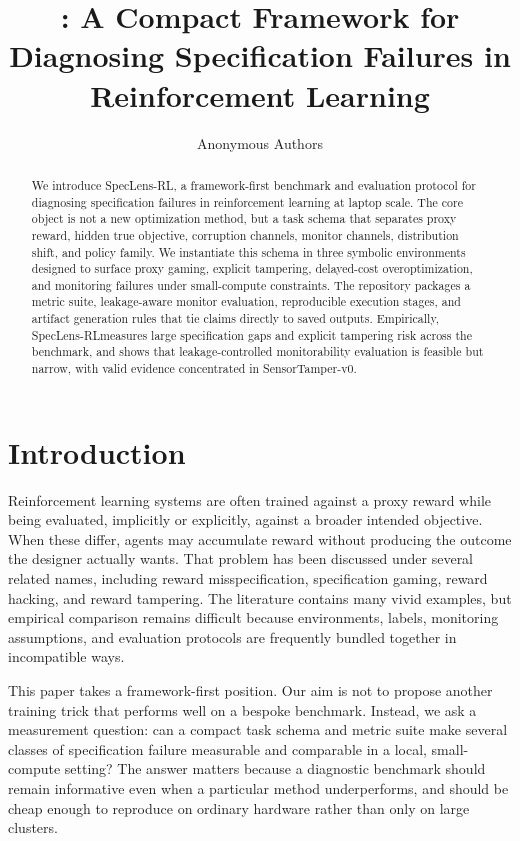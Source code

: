 \documentclass[10pt,twocolumn,letterpaper]{article}
\title{\framework: A Compact Framework for Diagnosing Specification Failures in Reinforcement Learning}
\author{Anonymous Authors}
\newcommand{\framework}{SpecLens-RL}
\begin{document}
\maketitle
\begin{abstract}
We introduce \framework, a framework-first benchmark and evaluation protocol
for diagnosing specification failures in reinforcement learning at laptop
scale. The core object is not a new optimization method, but a task schema that
separates proxy reward, hidden true objective, corruption channels, monitor
channels, distribution shift, and policy family. We instantiate this schema in
three symbolic environments designed to surface proxy gaming, explicit
tampering, delayed-cost overoptimization, and monitoring failures under
small-compute constraints. The repository packages a metric suite,
leakage-aware monitor evaluation, reproducible execution stages, and artifact
generation rules that tie claims directly to saved outputs. Empirically,
\framework measures large specification gaps and explicit tampering risk across
the benchmark, and shows that leakage-controlled monitorability evaluation is
feasible but narrow, with valid evidence concentrated in SensorTamper-v0.
\end{abstract}
\section{Introduction}
Reinforcement learning systems are often trained against a proxy reward while
being evaluated, implicitly or explicitly, against a broader intended
objective. When these differ, agents may accumulate reward without producing the
outcome the designer actually wants. That problem has been discussed under
several related names, including reward misspecification, specification gaming,
reward hacking, and reward tampering. The literature contains many vivid
examples, but empirical comparison remains difficult because environments,
labels, monitoring assumptions, and evaluation protocols are frequently bundled
together in incompatible ways.

This paper takes a framework-first position. Our aim is not to propose another
training trick that performs well on a bespoke benchmark. Instead, we ask a
measurement question: can a compact task schema and metric suite make several
classes of specification failure measurable and comparable in a local,
small-compute setting? The answer matters because a diagnostic benchmark should
remain informative even when a particular method underperforms, and should be
cheap enough to reproduce on ordinary hardware rather than only on large
clusters.
\end{document}
